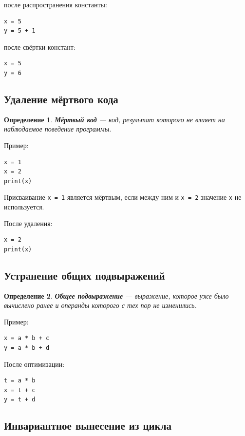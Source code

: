 \documentclass[12pt,a4paper]{article}
\newtheorem{definition}{Определение}
\begin{document}
после распространения константы:

\begin{lstlisting}
x = 5
y = 5 + 1
\end{lstlisting}

после свёртки констант:

\begin{lstlisting}
x = 5
y = 6
\end{lstlisting}

\subsection{Удаление мёртвого кода}

\begin{definition}
\textbf{Мёртвый код} --- код, результат которого не влияет на наблюдаемое поведение программы.
\end{definition}

Пример:

\begin{lstlisting}
x = 1
x = 2
print(x)
\end{lstlisting}

Присваивание \texttt{x = 1} является мёртвым, если между ним и \texttt{x = 2} значение \texttt{x} не используется.

После удаления:

\begin{lstlisting}
x = 2
print(x)
\end{lstlisting}

\subsection{Устранение общих подвыражений}

\begin{definition}
\textbf{Общее подвыражение} --- выражение, которое уже было вычислено ранее и операнды которого с тех пор не изменились.
\end{definition}

Пример:

\begin{lstlisting}
x = a * b + c
y = a * b + d
\end{lstlisting}

После оптимизации:

\begin{lstlisting}
t = a * b
x = t + c
y = t + d
\end{lstlisting}

\subsection{Инвариантное вынесение из цикла}
\end{document}
